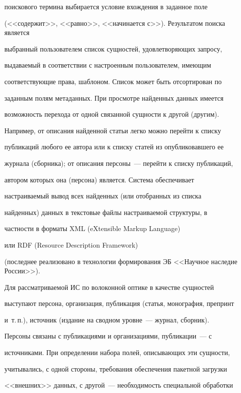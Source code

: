 поискового термина выбирается условие вхождения в заданное поле 


(<<содержит>>, <<равно>>, <<начинается с>>). Результатом поиска является 


выбранный пользователем список сущностей, удовлетворяющих запросу, 


выдаваемый в соответствии с настроенным пользователем, имеющим 


соответствующие права, шаблоном. Список может быть отсортирован по 


заданным полям метаданных. При просмотре найденных данных имеется 


возможность перехода от одной связанной сущности к другой (другим). 


Например, от описания найденной статьи легко можно перейти к списку 


публикаций любого ее автора или к списку статей из опубликовавшего ее 


журнала (сборника); от описания персоны~--- перейти к списку публикаций, 


автором которых она (персона) является. Система обеспечивает 


настраиваемый вывод всех найденных (или отобранных из списка 


найденных) данных в текстовые файлы настраиваемой структуры, в 


частности в форматы XML (eXtensible Markup Language)


или RDF (Resource Description Framework)


(последнее реализовано в технологии  формирования ЭБ <<Научное наследие России>>). 


    


    Для рассматриваемой ИС по волоконной оптике в качестве сущностей 


выступают персона, организация, публикация (статья, монография, препринт 


и~т.\,п.), источник (издание на сводном уровне~--- журнал, сборник). 


Персоны связаны с публикациями и организациями, публикации~--- с 


источниками. При определении набора полей, описывающих эти сущности, 


учитывались, с одной стороны, требования обеспечения пакетной загрузки 


<<внешних>> данных, с другой~--- необходимость специальной обработки 


